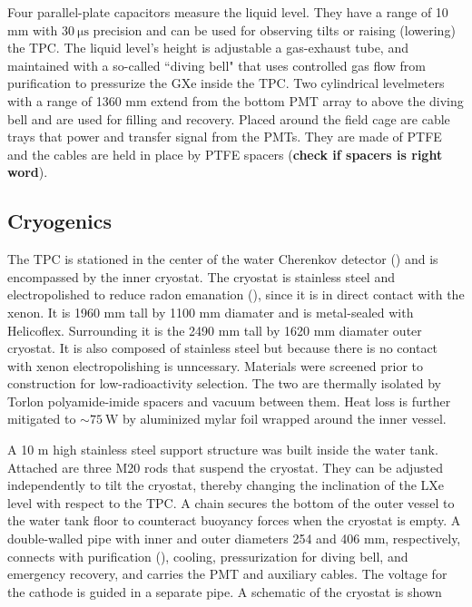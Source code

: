 Four parallel-plate capacitors measure the liquid level.  They have a range of 10 mm with $30\ \mathrm{\mu s}$ precision and can be used
for observing tilts or raising (lowering) the TPC.  The liquid level's height is adjustable a gas-exhaust tube, and maintained with a
so-called ``diving bell" that uses controlled gas flow from purification to pressurize the GXe inside the TPC.  Two cylindrical levelmeters
with a range of 1360 mm extend from the bottom PMT array to above the diving bell and are used for filling and recovery.  Placed around the
field cage are cable trays that power and transfer signal from the PMTs.  They are made of PTFE and the cables are held
in place by PTFE spacers (\textbf{check if spacers is right word}).



\subsection{Cryogenics}
\label{subsec:xenon1t_cryo}
The TPC is stationed in the center of the water Cherenkov detector () and is encompassed by the inner
cryostat.  The cryostat
is stainless steel and electropolished to reduce radon emanation (), since it is in direct
contact with the xenon.  It is 1960 mm tall by 1100 mm diamater and is metal-sealed
with Helicoflex.  Surrounding it is the 2490 mm tall by 1620 mm diamater outer cryostat.  It is also composed of stainless steel but
because there is no contact with xenon electropolishing is unncessary.  Materials were screened prior to construction for low-radioactivity
selection.  The two are thermally isolated by Torlon polyamide-imide spacers and
vacuum between them.  Heat loss is further mitigated to ${\sim} 75\ \mathrm{W}$ by aluminized mylar foil wrapped around the inner vessel.

A 10 m high stainless steel support structure was built inside the water tank.  Attached are three M20 rods that suspend the
cryostat.  They can be adjusted independently to tilt the cryostat, thereby changing the inclination of the LXe level with respect to the
TPC.  A chain secures the bottom of the outer vessel to the water tank floor to counteract buoyancy forces when the cryostat is empty.  A
double-walled pipe with inner and outer diameters 254 and 406 mm, respectively, connects with purification (),
cooling,
pressurization for diving bell, and emergency recovery, and carries the PMT and auxiliary cables.  The voltage for the cathode is guided
in a separate pipe.  A schematic of the cryostat is shown

